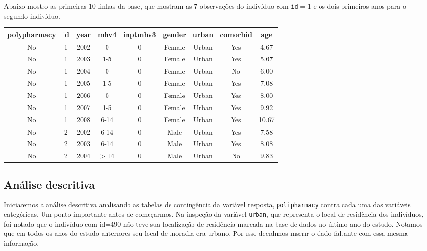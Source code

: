 \documentclass[
  11pt,
]{article}
\begin{document}
Abaixo mostro as primeiras 10 linhas da base, que mostram as 7 observações do indivíduo com \texttt{id} = 1 e os dois primeiros anos para o segundo indivíduo.

\begin{table}[H]
\centering
\begin{tabular}{ccccccccc}
\toprule
polypharmacy & id & year & mhv4 & inptmhv3 & gender & urban & comorbid & age\\
\midrule
No & 1 & 2002 & 0 & 0 & Female & Urban & Yes & 4.67\\
No & 1 & 2003 & 1-5 & 0 & Female & Urban & Yes & 5.67\\
No & 1 & 2004 & 0 & 0 & Female & Urban & No & 6.00\\
No & 1 & 2005 & 1-5 & 0 & Female & Urban & Yes & 7.08\\
No & 1 & 2006 & 0 & 0 & Female & Urban & Yes & 8.00\\
\addlinespace
No & 1 & 2007 & 1-5 & 0 & Female & Urban & Yes & 9.92\\
No & 1 & 2008 & 6-14 & 0 & Female & Urban & Yes & 10.67\\
No & 2 & 2002 & 6-14 & 0 & Male & Urban & Yes & 7.58\\
No & 2 & 2003 & 6-14 & 0 & Male & Urban & Yes & 8.08\\
No & 2 & 2004 & > 14 & 0 & Male & Urban & No & 9.83\\
\bottomrule
\end{tabular}
\end{table}

\hypertarget{anuxe1lise-descritiva}{%
\subsection{Análise descritiva}\label{anuxe1lise-descritiva}}

Iniciaremos a análise descritiva analisando as tabelas de contingência da variável resposta, \texttt{polipharmacy} contra cada uma das variáveis categóricas. Um ponto importante antes de começarmos. Na inspeção da variável \texttt{urban}, que representa o local de residência dos indivíduos, foi notado que o indivíduo com id=490 não teve sua localização de residência marcada na base de dados no último ano do estudo. Notamos que em todos os anos do estudo anteriores seu local de moradia era urbano. Por isso decidimos inserir o dado faltante com essa mesma informação.
\end{document}
